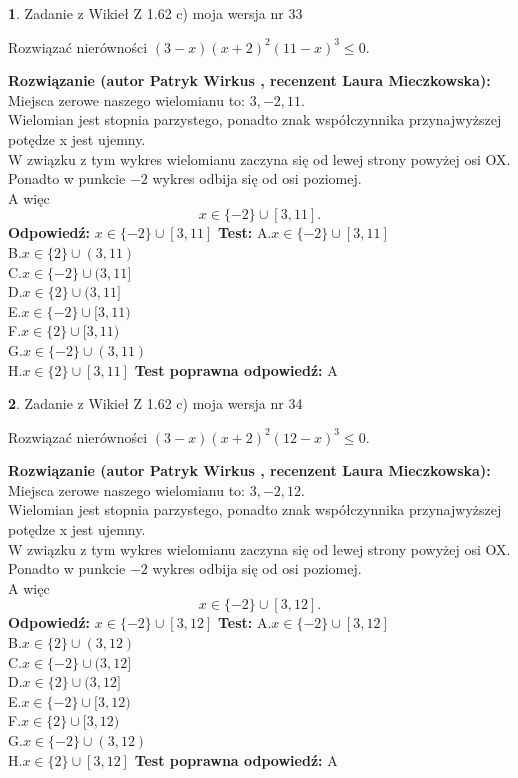 \documentclass[12pt, a4paper]{article}
\theoremstyle{definition} %
\newtheorem{zad}{}
\newcommand{\zadStart}[1]{\begin{zad}#1\newline}
\newcommand{\zadStop}{\end{zad}}
\newcommand{\rozwStart}[2]{\noindent \textbf{Rozwiązanie (autor #1 , recenzent #2): }\newline}
\newcommand{\rozwStop}{\newline}
\newcommand{\odpStart}{\noindent \textbf{Odpowiedź:}\newline}
\newcommand{\odpStop}{\newline}
\newcommand{\testStart}{\noindent \textbf{Test:}\newline}
\newcommand{\testStop}{\newline}
\newcommand{\kluczStart}{\noindent \textbf{Test poprawna odpowiedź:}\newline}
\newcommand{\kluczStop}{\newline}
\begin{document}
\zadStart{Zadanie z Wikieł Z 1.62 c) moja wersja nr 33}

Rozwiązać nierówności $(3-x)(x+2)^{2}(11-x)^{3}\le0$.
\zadStop
\rozwStart{Patryk Wirkus}{Laura Mieczkowska}
Miejsca zerowe naszego wielomianu to: $3, -2, 11$.\\
Wielomian jest stopnia parzystego, ponadto znak współczynnika przy\linebreak najwyższej potędze x jest ujemny.\\ W związku z tym wykres wielomianu zaczyna się od lewej strony powyżej osi OX.\\
Ponadto w punkcie $-2$ wykres odbija się od osi poziomej.\\
A więc $$x \in \{-2\} \cup [3,11].$$
\rozwStop
\odpStart
$x \in \{-2\} \cup [3,11]$
\odpStop
\testStart
A.$x \in \{-2\} \cup [3,11]$\\
B.$x \in \{2\} \cup (3,11)$\\
C.$x \in \{-2\} \cup (3,11]$\\
D.$x \in \{2\} \cup (3,11]$\\
E.$x \in \{-2\} \cup [3,11)$\\
F.$x \in \{2\} \cup [3,11)$\\
G.$x \in \{-2\} \cup (3,11)$\\
H.$x \in \{2\} \cup [3,11]$
\testStop
\kluczStart
A
\kluczStop



\zadStart{Zadanie z Wikieł Z 1.62 c) moja wersja nr 34}

Rozwiązać nierówności $(3-x)(x+2)^{2}(12-x)^{3}\le0$.
\zadStop
\rozwStart{Patryk Wirkus}{Laura Mieczkowska}
Miejsca zerowe naszego wielomianu to: $3, -2, 12$.\\
Wielomian jest stopnia parzystego, ponadto znak współczynnika przy\linebreak najwyższej potędze x jest ujemny.\\ W związku z tym wykres wielomianu zaczyna się od lewej strony powyżej osi OX.\\
Ponadto w punkcie $-2$ wykres odbija się od osi poziomej.\\
A więc $$x \in \{-2\} \cup [3,12].$$
\rozwStop
\odpStart
$x \in \{-2\} \cup [3,12]$
\odpStop
\testStart
A.$x \in \{-2\} \cup [3,12]$\\
B.$x \in \{2\} \cup (3,12)$\\
C.$x \in \{-2\} \cup (3,12]$\\
D.$x \in \{2\} \cup (3,12]$\\
E.$x \in \{-2\} \cup [3,12)$\\
F.$x \in \{2\} \cup [3,12)$\\
G.$x \in \{-2\} \cup (3,12)$\\
H.$x \in \{2\} \cup [3,12]$
\testStop
\kluczStart
A
\kluczStop
\end{document}
